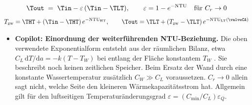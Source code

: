 \begin{equation}
  \label{eq.Tout.stat}
  \Tout \;=\; \Tin - \varepsilon\,(\Tin - \TLT),
  \qquad \varepsilon = 1 - e^{-\mathrm{NTU}} \quad \text{für } C_r \to 0
\end{equation}
\[
  T_{\mathrm{zw}} = \THT + (\Tin - \THT)\,e^{-\mathrm{NTU}_{\mathrm{HT}}},
  \qquad
  \Tout = \TLT + (T_{\mathrm{zw}} - \TLT)\,e^{-\mathrm{NTU}_{\mathrm{LT}}(\valveCA)}
\]

\begin{itemize}
  \item \textbf{Copilot: Einordnung der weiterführenden NTU-Beziehung.}
    Die oben verwendete Exponentialform entsteht aus der räumlichen
    Bilanz, etwa
    $C_L\,\mathrm dT/\mathrm da=-k(T-T_W)$ bei entlang der Fläche
    konstantem $T_W$ \cite[S.~840, Gl.~31.64]{almbauerThermomanagement2019}.
    Sie beschreibt noch keinen zeitlichen Speicher.
    Beim Ersatz der Wand durch eine konstante Wassertemperatur
    zusätzlich $C_W\gg C_L$ voraussetzen. $C_r\to0$ allein sagt
    nicht, welche Seite den kleineren Wärmekapazitätsstrom hat.
    Allgemein gilt für den luftseitigen Temperaturänderungsgrad
    $\varepsilon=(C_{\min}/C_L)\varepsilon_Q$.
\end{itemize}

